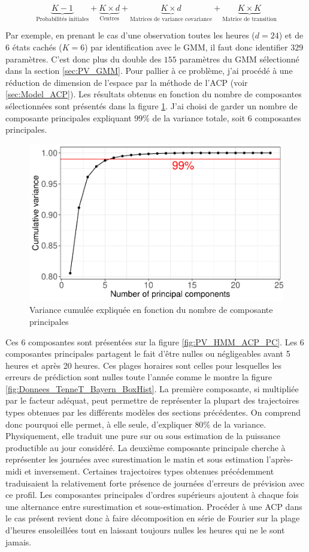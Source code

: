 \documentclass[12pt]{report}
\begin{document}
\begin{equation}
\underbrace{K-1}_\text{Probabilités initiales}  + \underbrace{K \times d}_\text{Centres}  +  \underbrace{K \times d}_\text{Matrices de variance covariance} + \underbrace{K \times K}_\text{Matrice de transition}
\end{equation}

Par exemple, en prenant le cas d'une observation toutes les heures ($d=24$) et de 6 états cachés ($K=6$) par identification avec le GMM, il faut donc identifier $329$ paramètres. C'est donc plus du double des $155$ paramètres du GMM sélectionné dans la section \ref{sec:PV_GMM}. Pour pallier à ce problème, j'ai procédé à une réduction de dimension de l'espace par la méthode de l'ACP (voir \ref{sec:Model_ACP}). Les résultats obtenus en fonction du nombre de composantes sélectionnées sont présentés dans la figure \ref{fig:PV_HMM_ACP_DimSelect}. J'ai choisi de garder un nombre de composante principales expliquant $99 \%$ de la variance totale, soit 6 composantes principales. 

\begin{figure}[h]
	\centering
	\includegraphics[width = 0.6 \linewidth]{Images/PV/ACP/ACP_DimSelect.pdf}
	\caption{Variance cumulée expliquée en fonction du nombre de composante principales}
	\label{fig:PV_HMM_ACP_DimSelect}
\end{figure}

Ces 6 composantes sont présentées sur la figure \ref{fig:PV_HMM_ACP_PC}. Les 6 composantes principales partagent le fait d'être nulles ou négligeables avant 5 heures et après 20 heures. Ces plages horaires sont celles pour lesquelles les erreurs de prédiction sont nulles toute l'année comme le montre la figure \ref{fig:Donnees_TenneT_Bayern_BoxHist}. La première composante, si multipliée par le facteur adéquat, peut permettre de représenter la plupart des trajectoires types obtenues par les différents modèles des sections précédentes. On comprend donc pourquoi elle permet, à elle seule, d'expliquer $80\%$ de la variance. Physiquement, elle traduit une pure sur ou sous estimation de la puissance productible au jour considéré. La deuxième composante principale cherche à représenter les journées avec surestimation le matin et sous estimation l'après-midi et inversement. Certaines trajectoires types obtenues précédemment traduisaient la relativement forte présence de journées d'erreurs de prévision avec ce profil. Les composantes principales d'ordres supérieurs ajoutent à chaque fois une alternance entre surestimation et sous-estimation. Procéder à une ACP dans le cas présent revient donc à faire décomposition en série de Fourier sur la plage d'heures ensoleillées tout en laissant toujours nulles les heures qui ne le sont jamais.
\end{document}
